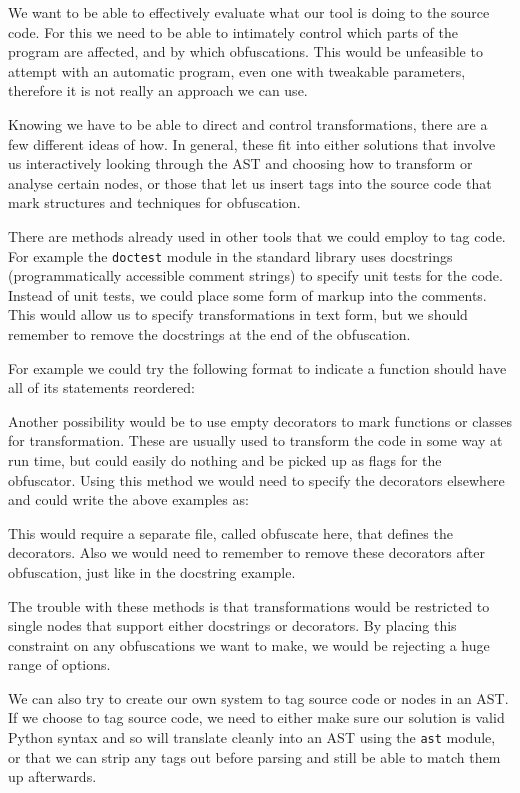 \documentclass[twoside,a4paper]{report}
\begin{document}
We want to be able to effectively evaluate what our tool is doing to the source code. For this we need to be able to intimately control
which parts of the program are affected, and by which obfuscations. This would be unfeasible to attempt with an automatic program,
even one with tweakable parameters, therefore it is not really an approach we can use.

Knowing we have to be able to direct and control transformations, there are a few different ideas of how. In general, these fit into
either solutions that involve us interactively looking through the AST and choosing how to transform or analyse certain
nodes, or those that let us insert tags into the source code that mark structures and techniques for obfuscation.

There are methods already used in other tools that we could employ to tag code. For example the \texttt{doctest} module in the standard
library uses docstrings (programmatically accessible comment strings) to specify unit tests for the code. Instead of unit tests,
we could place some form of markup into the comments. This would allow us to specify transformations in text form, but we should
remember to remove the docstrings at the end of the obfuscation.

For example we could try the following format to indicate a function should have all of its statements reordered:



Another possibility would be to use empty decorators to mark functions or classes for transformation. These are usually used to
transform the code in some way at run time, but could easily do nothing and be picked up as flags for the obfuscator. Using this
method we would need to specify the decorators elsewhere and could write the above examples as:



This would require a separate file, called obfuscate here, that defines the decorators. Also we would need to remember to
remove these decorators after obfuscation, just like in the docstring example.

The trouble with these methods is that transformations would be restricted to single nodes that support either docstrings or
decorators. By placing this constraint on any obfuscations we want to make, we would be rejecting a huge range of options.

We can also try to create our own system to tag source code or nodes in an AST. If we choose to tag source code, we need
to either make sure our solution is valid Python syntax and so will translate cleanly into an AST using the \texttt{ast}
module, or that we can strip any tags out before parsing and still be able to match them up afterwards.
\end{document}
